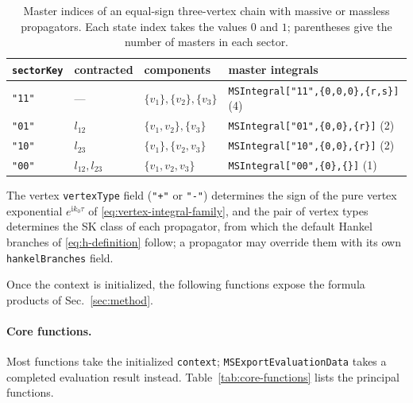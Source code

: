 \documentclass[11pt,a4paper]{article}
\numberwithin{table}{section}
\newcommand{\ii}{\mathrm i}
\begin{document}
\begin{table}[!htbp]
\footnotesize\begin{tabular}{@{}lllp{5.8cm}@{}}
\toprule
\texttt{sectorKey} & contracted & components & master integrals\\
\midrule
\texttt{"11"} & --- & $\{v_1\},\{v_2\},\{v_3\}$
  & \texttt{MSIntegral["11",\{0,0,0\},\{r,s\}]} (4)\\
\texttt{"01"} & $l_{12}$ & $\{v_1,v_2\},\{v_3\}$
  & \texttt{MSIntegral["01",\{0,0\},\{r\}]} (2)\\
\texttt{"10"} & $l_{23}$ & $\{v_1\},\{v_2,v_3\}$
  & \texttt{MSIntegral["10",\{0,0\},\{r\}]} (2)\\
\texttt{"00"} & $l_{12},l_{23}$ & $\{v_1,v_2,v_3\}$
  & \texttt{MSIntegral["00",\{0\},\{\}]} (1)\\
\bottomrule
\end{tabular}
\caption{Master indices of an equal-sign three-vertex chain with massive or massless
propagators. Each state index takes the values $0$ and $1$; parentheses give the number
of masters in each sector.}
\label{tab:chain-masters}
\end{table}
\FloatBarrier


The vertex \texttt{vertexType} field (\texttt{"+"} or \texttt{"-"}) determines the sign of the pure
vertex exponential $e^{\ii k_0\tau}$ of \eqref{eq:vertex-integral-family}, and the pair of vertex types determines the SK class of each propagator, from which the default Hankel branches of
\eqref{eq:h-definition} follow; a propagator may override them with its own \texttt{hankelBranches}
field.



Once the context is initialized, the following functions expose the formula products of Sec.~\ref{sec:method}.

\paragraph{Core functions.}
\label{sec:core}

Most functions take the initialized \texttt{context};
\texttt{MSExportEvaluationData} takes a completed evaluation result instead.
Table~\ref{tab:core-functions} lists the principal functions.
\end{document}
